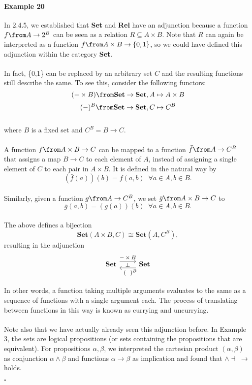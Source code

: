 \paragraph{Example 20} 
	In 2.4.5, we established that \textbf{Set} and \textbf{Rel} have an adjunction because a function $f \from A \to 2^B$ can be seen as a relation $R \subseteq A \times B$. Note that $R$ can again be interpreted as a function $f \from A \times B \to \{0, 1\}$, so we could have defined this adjunction within the category \textbf{Set}.\\\\In fact, \{0,1\} can be replaced by an arbitrary set $C$ and the resulting functions still describe the same. To see this, consider the following functors:
	 \[(-\times B) \from \textbf{Set} \to \textbf{Set}, A \mapsto A \times B\]
	\[(-)^B \from \textbf{Set} \to \textbf{Set}, C \mapsto C^B\]
	 \\where $B$ is a fixed set and $C^B = B \to C$.\\\\
	 A function $f \from A \times B \to C$ can be mapped to a function $\bar f \from A \to C^B$ that assigns a map $B \to C$ to each element of $A$, instead of assigning a single element of $C$ to each pair in $ A \times B$. It is defined in the natural way by \[(\bar f (a))(b) = f(a, b)\;\; \forall a \in A, b \in B.\] \\Similarly, given a function $g \from A \to C^B$, we set $\bar g \from A \times B \to C$ to \[\bar g (a, b) = (g(a))(b)\;\; \forall a \in A, b \in B.\]\\
	 The above defines a bijection \[\textbf{Set}(A \times B, C) \cong \textbf{Set}(A, C^B),\] resulting in the adjunction
	  	\[\begin{tikzcd}	
	 	[ampersand replacement=\&, every label/.append style = {font = \footnotesize}]
	 	\textbf{Set} \arrow[r, shift left=2,"-\times B","\bot"']
	 	\& \textbf{Set} \arrow[l, shift left=2, "\;\;\;(-)^B"]\\
	 \end{tikzcd}\]
	 In other words, a function taking multiple arguments evaluates to the same as a sequence of functions with a single argument each. The process of translating between functions in this way is known as currying and uncurrying.\\\\
	 Note also that we have actually already seen this adjunction before. In Example 3, the sets are logical propositions (or sets containing the propositions that are equivalent). For propositions $\alpha , \beta$, we interpreted the cartesian product $(\alpha , \beta)$ as conjunction $\alpha \land \beta$ and functions $\alpha \rightarrow \beta$ as implication and found that $\land \dashv \; \to$ holds.{\begin{flushright}$\square$\\\end{flushright}}
	 \vspace{\baselineskip}
	 \vspace{\baselineskip}
